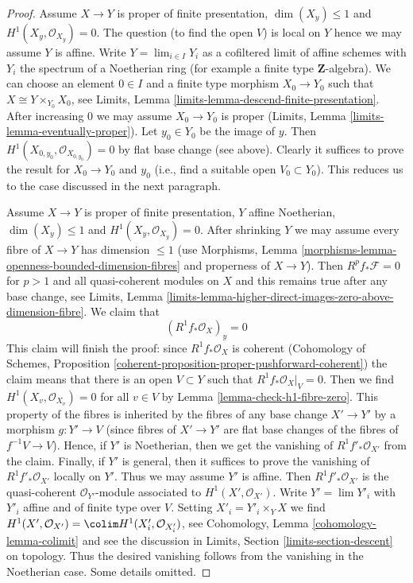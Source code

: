 \begin{proof}
\medskip\noindent
Assume $X \to Y$ is proper of finite presentation, $\dim(X_y) \leq 1$ and
$H^1(X_y, \mathcal{O}_{X_y}) = 0$. The question (to find the open $V$)
is local on $Y$ hence we may assume $Y$ is affine.
Write $Y = \lim_{i \in I} Y_i$ as a cofiltered limit of affine schemes
with $Y_i$ the spectrum of a Noetherian ring
(for example a finite type $\mathbf{Z}$-algebra).
We can choose an element $0 \in I$ and a finite type morphism
$X_0 \to Y_0$ such that $X \cong Y \times_{Y_0} X_0$, see
Limits, Lemma \ref{limits-lemma-descend-finite-presentation}.
After increasing $0$ we may assume $X_0 \to Y_0$ is proper
(Limits, Lemma \ref{limits-lemma-eventually-proper}).
Let $y_0 \in Y_0$ be the image of $y$.
Then $H^1(X_{0, y_0}, \mathcal{O}_{X_{0, y_0}}) = 0$
by flat base change (see above).
Clearly it suffices to prove the result for $X_0 \to Y_0$ and $y_0$
(i.e., find a suitable open $V_0 \subset Y_0$).
This reduces us to the case discussed in the next paragraph.

\medskip\noindent
Assume $X \to Y$ is proper of finite presentation, $Y$ affine Noetherian,
$\dim(X_y) \leq 1$ and $H^1(X_y, \mathcal{O}_{X_y}) = 0$.
After shrinking $Y$ we may assume every fibre of $X \to Y$
has dimension $\leq 1$ (use Morphisms, Lemma
\ref{morphisms-lemma-openness-bounded-dimension-fibres}
and properness of $X \to Y$). Then $R^pf_*\mathcal{F} = 0$
for $p > 1$ and all quasi-coherent modules on $X$
and this remains true after any base change, see Limits, Lemma
\ref{limits-lemma-higher-direct-images-zero-above-dimension-fibre}.
We claim that
$$
(R^1f_*\mathcal{O}_X)_y = 0
$$
This claim will finish the proof: since $R^1f_*\mathcal{O}_X$ is
coherent (Cohomology of Schemes, Proposition
\ref{coherent-proposition-proper-pushforward-coherent})
the claim means that there is an open $V \subset Y$
such that $R^1f_*\mathcal{O}_X|_V = 0$. Then we find
$H^1(X_v, \mathcal{O}_{X_v}) = 0$ for all $v \in V$
by Lemma \ref{lemma-check-h1-fibre-zero}. This property of the fibres
is inherited by the fibres of any base change $X' \to Y'$
by a morphism $g : Y' \to V$ (since fibres of $X' \to Y'$
are flat base changes of the fibres of $f^{-1}V \to V$).
Hence, if $Y'$ is Noetherian, then we get the vanishing
of $R^1f'_*\mathcal{O}_{X'}$ from the claim. Finally, if
$Y'$ is general, then it suffices to prove the vanishing of
$R^1f'_*\mathcal{O}_{X'}$ locally on $Y'$. Thus we may
assume $Y'$ is affine. Then $R^1f'_*\mathcal{O}_{X'}$
is the quasi-coherent $\mathcal{O}_{Y'}$-module associated
to $H^1(X', \mathcal{O}_{X'})$. Write $Y' = \lim Y'_i$
with $Y'_i$ affine and of finite type over $V$.
Setting $X'_i = Y'_i \times_Y X$ we find
$H^1(X', \mathcal{O}_{X'}) = \colim H^1(X'_i, \mathcal{O}_{X'_i})$, see
Cohomology, Lemma \ref{cohomology-lemma-colimit} and see the discussion
in Limits, Section \ref{limits-section-descent} on topology.
Thus the desired vanishing follows from the vanishing in the Noetherian case.
Some details omitted.


\end{proof}
